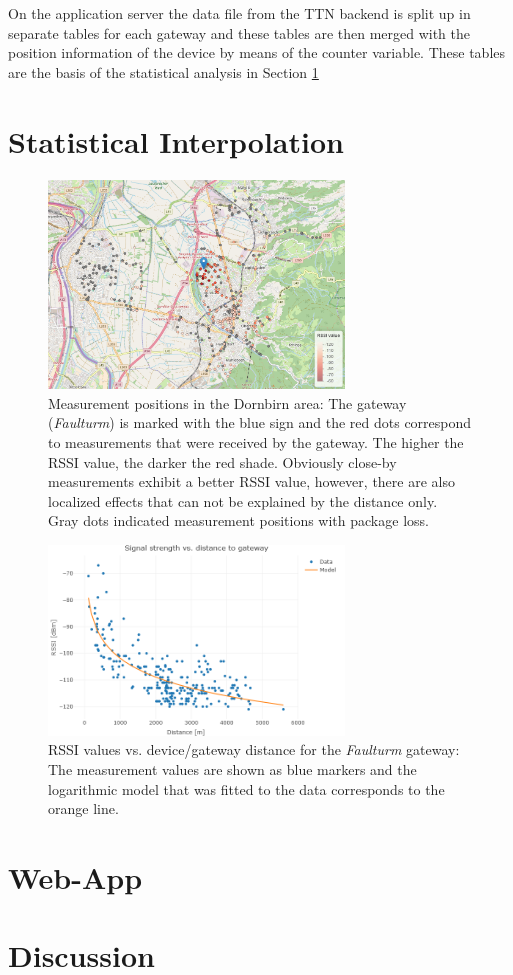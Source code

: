 On the application server the data file from the TTN backend is split up in separate tables for each gateway and these tables are then merged with the position information of the device by means of the counter variable. These tables are the basis of the statistical analysis in Section \ref{sec:kriging}


\section{Statistical Interpolation}\label{sec:kriging}


\begin{figure}[h!]
\centering
\includegraphics[width=0.7\textwidth]{figures/measurements}
\caption{Measurement positions in the Dornbirn area: The gateway (\emph{Faulturm}) is marked with the blue sign and the red dots correspond to measurements that were received by the gateway. The higher the RSSI value, the darker the red shade. Obviously close-by measurements exhibit a better RSSI value, however, there are also localized effects that can not be explained by the distance only. Gray dots indicated measurement positions with package loss.}\label{fig:meas}
\end{figure}

\begin{figure}[h!]
\centering
\includegraphics[width=0.7\textwidth]{figures/loglaw}
\caption{RSSI values vs. device/gateway distance for the \emph{Faulturm} gateway: The measurement values are shown as blue markers and the logarithmic model that was fitted to the data corresponds to the orange line.}\label{fig:law}
\end{figure}

\section{Web-App}\label{sec:app}

\section{Discussion}\label{sec:disc}





